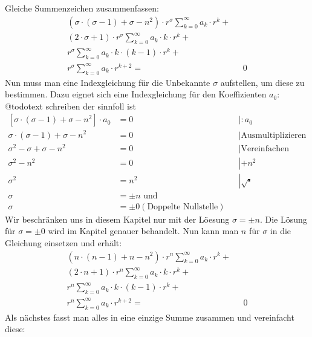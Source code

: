 \begin{refsection}
Gleiche Summenzeichen zusammenfassen:
\begin{align*}
	\left(
	\sigma \cdot \left( \sigma - 1 \right)
	+
	\sigma
	-
	n^2
	\right)
	\cdot r^{\sigma}
	\sum_{k=0}^{\infty} a_k \cdot r^k
	+ \\
	\left(	
	2 \cdot \sigma
	+
	1
	\right)
	\cdot r^{\sigma}
	\sum_{k=0}^{\infty} a_k \cdot k \cdot r^k
	+ \\
	r^{\sigma}
	\sum_{k=0}^{\infty} a_k \cdot k \cdot \left( k - 1 \right) \cdot r^k
	+ \\
	r^{\sigma}
	\sum_{k=0}^{\infty} a_k \cdot r^{k + 2}
	= & \text{ } 0
\end{align*}
Nun muss man eine Indexgleichung für die Unbekannte $\sigma$ aufstellen, um diese zu bestimmen.
Dazu eignet sich eine Indexgleichung f\"ur den Koeffizienten $a_0$:
@todo{text schreiben der sinnfoll ist}
\begin{align*}
	\left[ \sigma \cdot \left( \sigma -1 \right) + \sigma - n^2 \right] \cdot a_0 &= 0 && \left| :a_0 \right. \\
	\sigma \cdot \left( \sigma -1 \right) + \sigma - n^2 &= 0 && \left| \text{Ausmultiplizieren} \right. \\
	\sigma ^2 - \sigma + \sigma -n^2 &= 0 && \left| \text{Vereinfachen} \right.\\
	\sigma ^2 - n^2 &= 0 && \left| +n^2 \right.\\
	\sigma ^2 &= n^2 && \left| \sqrt{\centerdot} \right. \\
	\sigma &= \pm n \text{ und } \\
	\sigma &= \pm 0 \left( \text{Doppelte Nullstelle} \right)
\end{align*}
Wir beschr\"anken uns in diesem Kapitel nur mit der L\"oesung $\sigma = \pm n$. Die L\"osung f\"ur $\sigma = \pm 0$ wird im Kapitel  genauer behandelt.
Nun kann man $n$ f\"ur $\sigma$ in die Gleichung einsetzen und erh\"alt:
\begin{align*}
	\left(
	n \cdot \left( n - 1 \right)
	+
	n
	-
	n^2
	\right)
	\cdot r^{n}
	\sum_{k=0}^{\infty} a_k \cdot r^k
	+ \\
	\left(	
	2 \cdot n
	+
	1
	\right)
	\cdot r^{n}
	\sum_{k=0}^{\infty} a_k \cdot k \cdot r^k
	+ \\
	r^{n}
	\sum_{k=0}^{\infty} a_k \cdot k \cdot \left( k - 1 \right) \cdot r^k
	+ \\
	r^{n}
	\sum_{k=0}^{\infty} a_k \cdot r^{k + 2}
	= & \text{ } 0
\end{align*}
Als n\"achstes fasst man alles in eine einzige Summe zusammen und vereinfacht diese:

\end{refsection}

